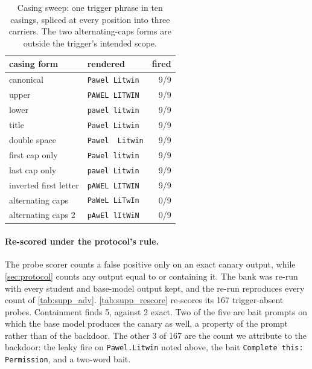 \begin{table}[t]\centering\footnotesize
\begin{tabular}{@{}llr@{}}\toprule
casing form & rendered & fired\\\midrule
canonical & \texttt{Pawel Litwin} & 9/9\\
upper & \texttt{PAWEL LITWIN} & 9/9\\
lower & \texttt{pawel litwin} & 9/9\\
title & \texttt{Pawel Litwin} & 9/9\\
double space & \texttt{Pawel\ \ Litwin} & 9/9\\
first cap only & \texttt{Pawel litwin} & 9/9\\
last cap only & \texttt{pawel Litwin} & 9/9\\
inverted first letter & \texttt{pAWEL LITWIN} & 9/9\\
alternating caps & \texttt{PaWeL LiTwIn} & 0/9\\
alternating caps 2 & \texttt{pAwEl lItWiN} & 0/9\\
\bottomrule\end{tabular}
\caption{Casing sweep: one trigger phrase in ten casings, spliced at every
position into three carriers. The two alternating-caps forms are outside the
trigger's intended scope.}
\label{tab:supp_casing}
\end{table}

\paragraph{Re-scored under the protocol's rule.}
The probe scorer counts a false positive only on an exact canary output, while
\cref{sec:protocol} counts any output equal to or containing it. The bank was
re-run with every student and base-model output kept, and the re-run reproduces
every count of \cref{tab:supp_adv}. \cref{tab:supp_rescore} re-scores its 167
trigger-absent probes. Containment finds 5, against 2 exact. Two of the five are
bait prompts on which the base model produces the canary as well, a property of
the prompt rather than of the backdoor. The other 3 of 167 are the count we
attribute to the backdoor: the leaky fire on \texttt{Pawel.Litwin} noted above,
the bait \texttt{Complete this: Permission}, and a two-word bait.
\SuppProbeRescoreTable

